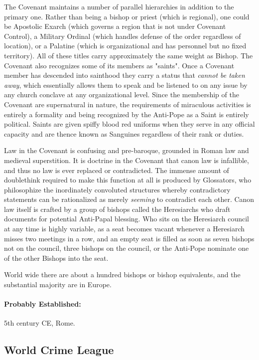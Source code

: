 The Covenant maintains a number of parallel hierarchies in addition to the primary one. Rather than being a bishop or priest (which is regional), one could be Apostolic Exarch (which governs a region that is not under Covenant Control), a Military Ordinal (which handles defense of the order regardless of location), or a Palatine (which is organizational and has personnel but no fixed territory). All of these titles carry approximately the same weight as Bishop. The Covenant also recognizes some of its members as "saints". Once a Covenant member has descended into sainthood they carry a status that \textit{cannot be taken away}, which essentially allows them to speak and be listened to on any issue by any church conclave at any organizational level. Since the membership of the Covenant are supernatural in nature, the requirements of miraculous activities is entirely a formality and being recognized by the Anti-Pope as a Saint is entirely political. Saints are given spiffy blood red uniforms when they serve in any official capacity and are thence known as Sanguines regardless of their rank or duties.

Law in the Covenant is confusing and pre-baroque, grounded in Roman law and medieval superstition. It is doctrine in the Covenant that canon law is infallible, and thus no law is ever replaced or contradicted. The immense amount of doublethink required to make this function at all is produced by Glossators, who philosophize the inordinately convoluted structures whereby contradictory statements can be rationalized as merely \textit{seeming} to contradict each other. Canon law itself is crafted by a group of bishops called the Heresiarchs who draft documents for potential Anti-Papal blessing. Who sits on the Heresiarch council at any time is highly variable, as a seat becomes vacant whenever a Heresiarch misses two meetings in a row, and an empty seat is filled as soon as seven bishops not on the council,  three bishops on the council, or the Anti-Pope nominate one of the other Bishops into the seat.

World wide there are about a hundred bishops or bishop equivalents, and the substantial majority are in Europe.

\paragraph{Probably Established:} 5th century CE, Rome.

\subsection{World Crime League} 

